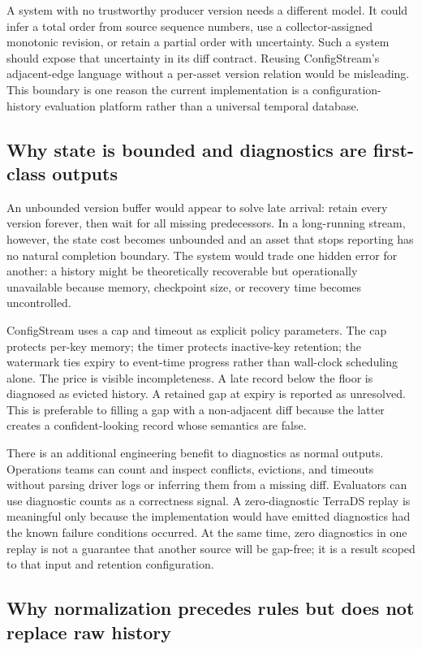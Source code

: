 A system with no trustworthy producer version needs a different model. It could infer a total order from source sequence numbers, use a collector-assigned monotonic revision, or retain a partial order with uncertainty. Such a system should expose that uncertainty in its diff contract. Reusing ConfigStream's adjacent-edge language without a per-asset version relation would be misleading. This boundary is one reason the current implementation is a configuration-history evaluation platform rather than a universal temporal database.

\subsection{Why state is bounded and diagnostics are first-class outputs}

An unbounded version buffer would appear to solve late arrival: retain every version forever, then wait for all missing predecessors. In a long-running stream, however, the state cost becomes unbounded and an asset that stops reporting has no natural completion boundary. The system would trade one hidden error for another: a history might be theoretically recoverable but operationally unavailable because memory, checkpoint size, or recovery time becomes uncontrolled.

ConfigStream uses a cap and timeout as explicit policy parameters. The cap protects per-key memory; the timer protects inactive-key retention; the watermark ties expiry to event-time progress rather than wall-clock scheduling alone. The price is visible incompleteness. A late record below the floor is diagnosed as evicted history. A retained gap at expiry is reported as unresolved. This is preferable to filling a gap with a non-adjacent diff because the latter creates a confident-looking record whose semantics are false.

There is an additional engineering benefit to diagnostics as normal outputs. Operations teams can count and inspect conflicts, evictions, and timeouts without parsing driver logs or inferring them from a missing diff. Evaluators can use diagnostic counts as a correctness signal. A zero-diagnostic TerraDS replay is meaningful only because the implementation would have emitted diagnostics had the known failure conditions occurred. At the same time, zero diagnostics in one replay is not a guarantee that another source will be gap-free; it is a result scoped to that input and retention configuration.

\subsection{Why normalization precedes rules but does not replace raw history}

